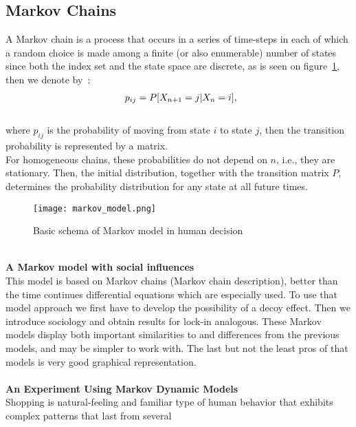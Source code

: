 \subsection{Markov Chains} \label{subsec:chain}
A Markov chain is a process that occurs in a series of time-steps in each of which a random choice is made
among a finite (or also enumerable) number of states since both the index set and the state space are discrete,
as is seen on figure~\ref{markovmodel}, then we denote by~\cite{patel}:\\
\begin{equation} \label{eq:6}
\begin{array}{l@{}l}
	p_{ij}=P[X_{n+1}=j|X_n=i],
\end{array}
\end{equation}\\
where $p_{ij}$ is the probability of moving from state $i$ to state $j$, then the transition probability is represented by a matrix.\\
For homogeneous chains, these probabilities do not depend on $n$, i.e., they are stationary.
Then, the initial distribution, together with the transition matrix $P$, determines the probability distribution for any state at all future times.\\
\begin{figure}[h!]
	\begin{center}
		\texttt{[image: markov\_model.png]}
	\end{center}
	\caption{Basic schema of Markov model in human decision~\cite{patel}}
	\label{markovmodel}
\end{figure}
\\
\textbf{A Markov model with social influences} \label{subsec:markov}\\
This model is based on Markov chains (Markov chain description), better than the time continues differential
equations which are especially used.
To use that model approach we first have to develop the possibility of a decoy effect.
Then we introduce sociology and obtain results for lock-in analogous.
These Markov models display both important similarities to and differences from the previous models, and may be simpler to work with.
The last but not the least pros of that models is very good graphical representation.\\
\\
\textbf{An Experiment Using Markov Dynamic Models} \label{subsec:markov_dynamic}\\
Shopping is natural-feeling and familiar type of human behavior that exhibits complex patterns that last from several
